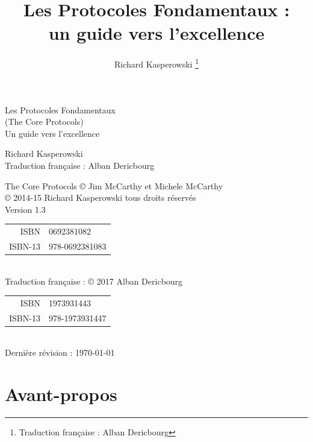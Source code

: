 \documentclass[paper=6in:9in,pagesize=pdftex,headinclude=on,footinclude=on,11pt]{scrbook}
\author{Richard Kasperowski \thanks{Traduction française : Alban Dericbourg}}
\title{Les Protocoles Fondamentaux :\\un guide vers l'excellence}
\date{}
\begin{document}
\frontmatter

\begin{titlepage}
	\sffamily
	\centering

	\vspace*{\fill}

	{\Huge Les Protocoles Fondamentaux\\[-.25em]
	{\LARGE (The Core Protocols)}\\[1em]}
	{\huge Un guide vers l'excellence}

	\vspace*{\fill}
	\vspace*{\fill}

	{\huge Richard Kasperowski}\\[2em]
	Traduction française : Alban Dericbourg\par

	\vspace*{\fill}
\end{titlepage}

\vspace*{\fill}
\begin{center}
	The Core Protocols © Jim McCarthy et Michele McCarthy \\[1em]

	\copyright{} 2014-15 Richard Kasperowski tous droits réservés\\
	Version 1.3\\
	\begin{tabular}{rl}
		ISBN & 0692381082 \\
		ISBN-13 & 978-0692381083\\
	\end{tabular}\\[1em]

	Traduction française : \copyright{} 2017 Alban Dericbourg\\
	\begin{tabular}{rl}
		ISBN & 1973931443 \\
		ISBN-13 & 978-1973931447\\
	\end{tabular}\\[1em]
	Dernière révision : \today
\end{center}
\pagebreak

\setcounter{secnumdepth}{1}
\setcounter{tocdepth}{1}
\tableofcontents

\setlength{\parskip}{0.5em}

\chapter{Avant-propos}
\end{document}
